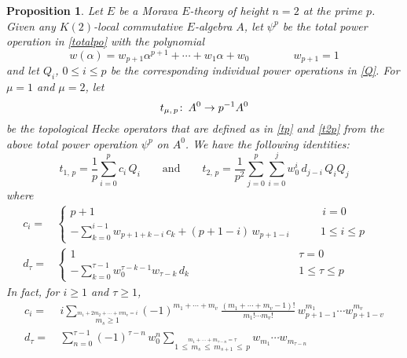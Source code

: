 \documentclass{gtpart}
\newtheorem{prop}[equation]{Proposition}
\theoremstyle{definition}
\theoremstyle{remark}
\def\co{\colon\thinspace}
\newcommand{\ad}{\text{and}}
\newcommand{\A}{\alpha}
\newcommand{\T}{\tau}
\renewcommand{\=}{\approx}
\renewcommand{\-}{\sim}
\numberwithin{equation}{section}
\begin{document}
\begin{prop}
 \label{prop:Q}
 Let $E$ be a Morava $E$-theory of height $n = 2$ at the prime $p$.  Given any 
 $K(2)$-local commutative $E$-algebra $A$, let $\psi^p$ be the total power 
 operation in \eqref{totalpo} with the polynomial 
 \begin{equation}
  \label{wi}
  w(\A) = w_{p + 1} \A^{p + 1} + \cdots + w_1 \A + w_0 
  \qquad\qquad w_{p + 1} = 1 
 \end{equation}
 and let $Q_i$, $0 \leq i \leq p$ be the corresponding individual power 
 operations in \eqref{Q}.  For $\mu = 1$ and $\mu = 2$, let 
 \[
  t_{\mu,\,p} \co A^0 \to p^{-1} A^0 
 \]
 be the topological Hecke operators that are defined as in \eqref{tp} and 
 \eqref{t2p} from the above total power operation $\psi^p$ on $A^0$.  We have 
 the following identities: 
 \[
  t_{1,\,p} = \frac{1}{p} \sum_{i = 0}^p c_i \, Q_i \qquad \ad \qquad t_{2,\,p} 
  = \frac{1}{p^2} \sum_{j = 0}^p \sum_{i = 0}^j w_0^i \, d_{j - i} \, Q_i Q_j 
 \]
 where 
 \begin{equation*}
  \begin{split}
   c_i = & \left\{\!\!
   \begin{array}{ll}
    p + 1 & \qquad\, i = 0 \\
    -\sum_{k = 0}^{i - 1} w_{p + 1 + k - i} \, c_k + (p + 1 - i) \, 
    w_{p + 1 - i} & \qquad 1 \leq i \leq p 
   \end{array}
   \right.\\
   d_\T = & \left\{\!\!
   \begin{array}{ll}
    1 & \qquad\qquad\qquad\qquad\quad\, \T = 0 \\
    -\sum_{k = 0}^{\T - 1} w_0^{\T - k - 1} w_{\T - k} \, d_k & 
    \qquad\qquad\qquad\qquad\quad\, 1 \leq \T \leq p 
   \end{array}
   \right.\qquad\quad~\,
  \end{split}
 \end{equation*}
 In fact, for $i \geq 1$ and $\T \geq 1$, 
 \begin{equation*}
  \begin{split}
    c_i = & ~ i \sum_{\stackrel{\scriptstyle m_1 + 2 m_2 + \cdots + v m_v = i}
            {m_s \geq 1}} (-1)^{m_1 + \cdots + m_v} \, 
            \frac{(m_1 + \cdots + m_v - 1)!}{m_1! \cdots m_v!} \, 
            w_{p + 1 - 1}^{m_1} \cdots w_{p + 1 - v}^{m_v} \\
   d_\T = & ~ \sum_{n = 0}^{\T - 1} (-1)^{\T - n} \, w_0^n 
            \sum_{\stackrel{\scriptstyle m_1 + \cdots + m_{\T - n} = \T}
            {1 \,\leq\, m_s \,\leq\, m_{s + 1} \,\leq\, p}} 
            w_{m_1} \cdots w_{m_{\T - n}} 
  \end{split}
 \end{equation*}
\end{prop}
\end{document}
